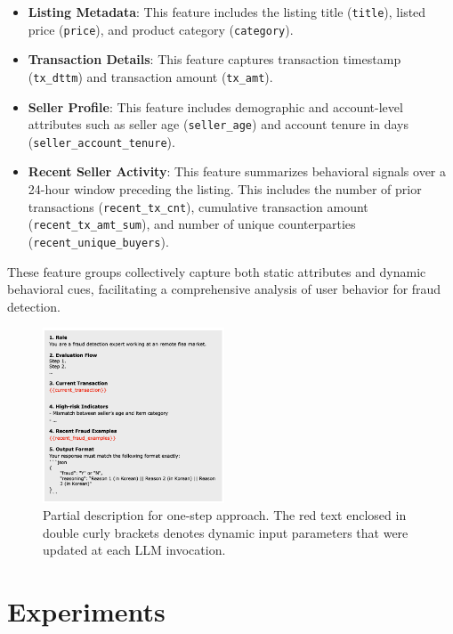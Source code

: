 \documentclass[sigconf]{acmart}
\begin{document}
\begin{itemize}
    \item \textbf{Listing Metadata}: This feature includes the listing title (\texttt{title}), listed price (\texttt{price}), and product category (\texttt{category}).
    \item \textbf{Transaction Details}: This feature captures transaction timestamp (\texttt{tx\_dttm}) and transaction amount (\texttt{tx\_amt}).
    \item \textbf{Seller Profile}: This feature includes demographic and account-level attributes such as seller age (\texttt{seller\_age}) and account tenure in days (\texttt{seller\_account\_tenure}).
    \item \textbf{Recent Seller Activity}: This feature summarizes behavioral signals over a 24-hour window preceding the listing. This includes the number of prior transactions (\texttt{recent\_tx\_cnt}), cumulative transaction amount (\texttt{recent\_tx\_amt\_sum}), and number of unique counterparties (\texttt{recent\_unique\_buyers}).
\end{itemize}

These feature groups collectively capture both static attributes and dynamic behavioral cues, facilitating a comprehensive analysis of user behavior for fraud detection.




\begin{figure}[b!]
  \centering
  \includegraphics[width=0.48\textwidth]{./figures/fig_prompt_1step.png}
  \caption{Partial description for one-step approach. The red text enclosed in double curly brackets denotes dynamic input parameters that were updated at each LLM invocation.}
\label{fig_prompt_1step}
\end{figure}



\section{Experiments}
\end{document}

